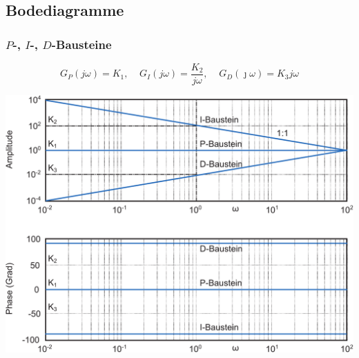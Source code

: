 \documentclass[a4paper,twocolumn,10pt]{article}
\begin{document}
\subsection{Bodediagramme}

\subsubsection{$P$-, $I$-, $D$-Bausteine}
\begin{equation*}
G_P(j\omega)=K_1,\;\;\;\;G_I(j\omega)=\frac{K_2}{j\omega},\;\;\;\;G_D(\jmath\omega)=K_3j\omega
\end{equation*}
\begin{center}
\includegraphics[width=0.95\columnwidth]{Grafiken/Bodediagramme_P_I_D}
\end{center}
\end{document}
